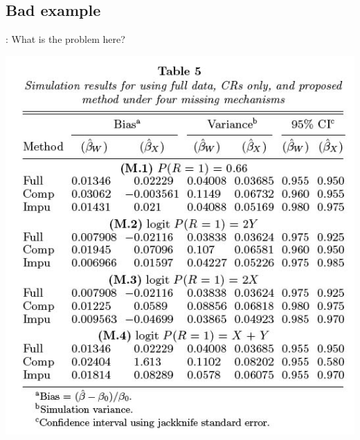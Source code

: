 \subsection{Bad example}
\begin{frame}{\secname: \subsecname}
What is the problem here? \\
\begin{center}
	\includegraphics[scale=0.4]{images/paik_tab5}
\end{center}

	
\end{frame}



